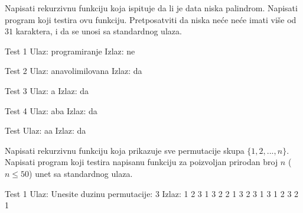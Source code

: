 
\begin{Exercise}[label=113]
Napisati rekurzivnu funkciju  koja ispituje da li je data niska
  palindrom. Napisati program koji testira ovu funkciju. Pretposatviti
  da niska neće neće imati više od $31$ karaktera, i da se unosi sa standardnog
  ulaza.
  
\begin{miditest}
\begin{test}{Test 1}
Ulaz:    programiranje    
Izlaz:   ne                   
\end{test}
\end{miditest}
\begin{miditest}
\begin{test}{Test 2}
Ulaz:    anavolimilovana 
Izlaz:   da                   
\end{test}
\end{miditest}

\begin{minitest}
\begin{test}{Test 3}
Ulaz:    a        
Izlaz:   da 
\end{test}
\end{minitest}
\begin{minitest}
\begin{test}{Test 4}
Ulaz:    aba   
Izlaz:   da 
\end{test}
\end{minitest}
\begin{minitest}
\begin{test}{Test }
Ulaz:    aa
Izlaz:   da 
\end{test}
\end{minitest}

\end{Exercise}
\begin{Answer}[ref=113]
\end{Answer}

\begin{Exercise}[label=107, difficulty=1]
Napisati rekurzivnu funkciju koja prikazuje sve permutacije skupa $\{1, 2, ... ,n\}$. Napisati program koji testira napisanu funkciju za poizvoljan prirodan broj $n$ ($n \le 50$) unet sa standardnog ulaza.

\begin{miditest}
\begin{test}{Test 1}
Ulaz:   Unesite duzinu permutacije: 3
Izlaz:  1 2 3
        1 3 2
        2 1 3
        2 3 1
        3 1 2
        3 2 1
\end{test}
\end{miditest}

\end{Exercise}
\begin{Answer}[ref=107]
\end{Answer}

